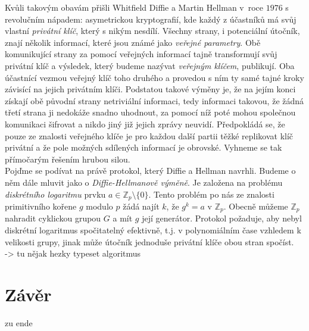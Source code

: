 \documentclass [12pt]{report}
\begin{document}
Kvůli takovým obavám přišli Whitfield Diffie a Martin Hellman v~roce $1976$ s revolučním nápadem: asymetrickou kryptografií, kde každý z účastníků má svůj vlastní \textit{privátní klíč}, který s nikým nesdílí. Všechny strany, i potenciální útočník, znají několik informací, které jsou známé jako \textit{veřejné parametry}. Obě komunikující strany za pomocí veřejných informací tajně transformují svůj privátní klíč a výsledek, který budeme nazývat \textit{veřejným klíčem}, publikují. Oba účastnící vezmou veřejný klíč toho druhého a provedou s ním ty samé tajné kroky závisící na jejich privátním klíči. Podstatou takové výměny je, že na jejím konci získají obě původní strany netriviální informaci, tedy informaci takovou, že žádná třetí strana ji nedokáže snadno uhodnout, za pomocí níž poté mohou společnou komunikaci šifrovat a nikdo jiný již jejich zprávy neuvidí. Předpokládá se, že pouze ze znalosti veřejného klíče je pro každou další partii těžké replikovat klíč privátní a že pole možných sdílených informací je obrovské. Vyhneme se tak přímočarým řešením hrubou silou.\\

Pojďme se podívat na právě protokol, který Diffie a Hellman navrhli. Budeme o něm dále mluvit jako o \textit{Diffie-Hellmanově výměně}. Je založena na problému \textit{diskrétního logaritmu} prvku $a \in \mathbb{Z}_p \setminus \lbrace 0 \rbrace$. Tento problém po nás ze znalosti primitivního kořene $g$ modulo $p$ žádá najít $k$, že $g^k = a$ v $\mathbb{Z}_p$. Obecně můžeme $\mathbb{Z}_p$ nahradit cyklickou grupou $G$ a mít $g$ její generátor. Protokol požaduje, aby nebyl diskrétní logaritmus spočitatelný efektivně, t.j. v polynomiálním čase vzhledem k velikosti grupy, jinak může útočník jednoduše privátní klíče obou stran spočíst.\\


-> tu nějak hezky typeset algoritmus



\chapter*{Závěr}
zu ende
\end{document}

